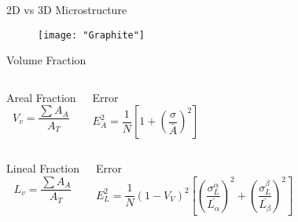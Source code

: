 \documentclass[10pt]{beamer}
\begin{document}
{%
\begin{frame}[fragile]{2D vs 3D Microstructure}

\begin{figure}[H]
\texttt{[image: "Graphite"]}

\end{figure}
    
\end{frame}
}
{%
\begin{frame}[fragile]{Volume Fraction}


  \begin{columns}[T,onlytextwidth]
 
\begin{block}{Areal Fraction}
\begin{equation*}
V_{v} = \dfrac{\sum A_{A}}{A_{T}}
\end{equation*} 
\end{block}
 

\begin{block}{Error}
\begin{equation*}
E_{A}^{2} = \dfrac{1}{N}\left[ 1+ \left( \dfrac{\sigma}{\bar{A}} \right)^{2} \right]
\end{equation*} 
\end{block}

\end{columns}

  \begin{columns}[T,onlytextwidth]
\begin{block}{Lineal Fraction}
\begin{equation*}
L_{v} = \dfrac{\sum A_{A}}{A_{T}}
\end{equation*} 
\end{block}
 

\begin{block}{Error}
\small
\begin{equation*}
E_{L}^{2} = \dfrac{1}{N}(1-V_{V})^{2}\left[ \left( \dfrac{\sigma^{\alpha}_{L}}{\bar{L_{\alpha}}} \right)^{2} + \left( \dfrac{\sigma^{\beta}_{L}}{\bar{L_{\beta}}} \right)^{2} \right]
\end{equation*}


\end{block}
\end{columns}
\end{frame}}
\end{document}
